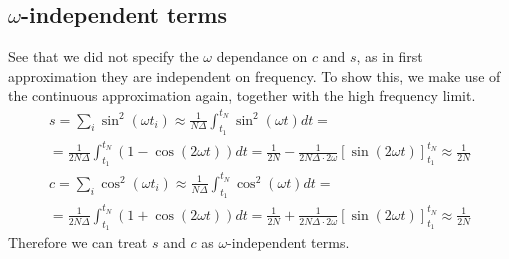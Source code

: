 \documentclass[a4paper,11pt,fleqn]{article}
\begin{document}
\subsection{$\omega$-independent terms}
See that we did not specify the $\omega$ dependance on $c$ and $s$, as 
in first approximation they are independent on frequency. To show this, 
we make use of the continuous approximation again, together with the high 
frequency limit. 
\begin{gather*}
    s = \sum_i \sin^2(\omega t_i)\approx \frac{1}{N\Delta}\int_{t_1}^{t_N} \sin^2(\omega t)dt =\\
    = \frac{1}{2N\Delta} \int_{t_1}^{t_N}(1-\cos(2\omega t))dt = \frac{1}{2N}-\frac{1}{2N \Delta \cdot 2\omega}[\sin(2\omega t)]_{t_1}^{t_N}\approx \frac{1}{2N}
\end{gather*}
\begin{gather*}
    c = \sum_i \cos^2(\omega t_i)\approx \frac{1}{N\Delta}\int_{t_1}^{t_N} \cos^2(\omega t)dt =\\
    = \frac{1}{2N\Delta} \int_{t_1}^{t_N}(1+\cos(2\omega t))dt = \frac{1}{2N}+\frac{1}{2N \Delta \cdot 2\omega}[\sin(2\omega t)]_{t_1}^{t_N}\approx \frac{1}{2N}
\end{gather*}
Therefore we can treat $s$ and $c$ as $\omega$-independent terms.
\end{document}

